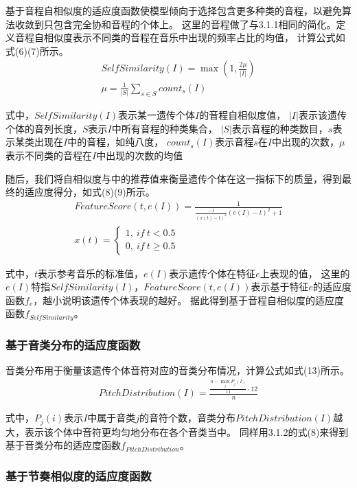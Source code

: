 \documentclass{article}
\begin{document}
基于音程自相似度的适应度函数使模型倾向于选择包含更多种类的音程，以避免算法收敛到只包含完全协和音程的个体上。
这里的音程做了与3.1.1相同的简化。定义音程自相似度表示不同类的音程在音乐中出现的频率占比的均值，
计算公式如式(6)(7)所示。
\begin{gather}
    SelfSimilarity(I)=\max(1, \frac{2\mu}{|I|})\\
    \mu=\frac{1}{|S|}\sum_{s\in S} count_s(I)
\end{gather}

式中，$SelfSimilarity(I)$表示某一遗传个体$I$的音程自相似度值，
$|I|$表示该遗传个体的音列长度，$S$表示$I$中所有音程的种类集合，
$|S|$表示音程的种类数目，$s$表示某类出现在$I$中的音程，如纯八度，
$count_s(I)$表示音程$s$在$I$中出现的次数，$\mu$表示不同类的音程在$I$中出现的次数的均值

随后，我们将自相似度与\cite{article1}中的推荐值来衡量遗传个体在这一指标下的质量，得到最终的适应度得分，如式(8)(9)所示。
\begin{gather}
    FeatureScore(t,e(I))=\frac{1}{\frac{-1}{(x(t)-t)^2}(e(I)-t)^2+1}\\
    x(t)=\left\{\begin{matrix}
        1,\ if\ t<0.5\\ 
        0,\ if\ t\geq 0.5
        \end{matrix}\right.
\end{gather}

式中，$t$表示参考音乐的标准值，$e(I)$表示遗传个体在特征$e$上表现的值，
这里的$e(I)$特指$SelfSimilarity(I)$，$FeatureScore(t,e(I))$表示基于特征$e$的适应度函数$f_e$，越小说明该遗传个体表现的越好。
据此得到基于音程自相似度的适应度函数$f_{SelfSimilarity}$。

\subsubsection{基于音类分布的适应度函数}

音类分布用于衡量该遗传个体音符对应的音类分布情况，计算公式如式(13)所示。
\begin{gather}
    PitchDistribution(I)=\frac{\frac{n-\max_j P_j(I)}{11}\cdot 12}{n}
\end{gather}

式中，$P_j(i)$表示$I$中属于音类$j$的音符个数，音类分布$PitchDistribution(I)$越大，表示该个体中音符更均匀地分布在各个音类当中。
同样用3.1.2的式(8)来得到基于音类分布的适应度函数$f_{PitchDistribution}$。

\subsubsection{基于节奏相似度的适应度函数}
\end{document}
